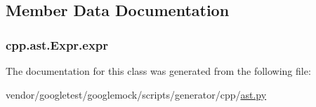 \subsection{Member Data Documentation}
\subsubsection[{\texorpdfstring{expr}{expr}}]{\setlength{\rightskip}{0pt plus 5cm}cpp.\+ast.\+Expr.\+expr}\hypertarget{classcpp_1_1ast_1_1Expr_a2f4e13fb0176f2616f8703103c806462}{}\label{classcpp_1_1ast_1_1Expr_a2f4e13fb0176f2616f8703103c806462}


The documentation for this class was generated from the following file\+:\begin{DoxyCompactItemize}
\item 
vendor/googletest/googlemock/scripts/generator/cpp/\hyperlink{ast_8py}{ast.\+py}\end{DoxyCompactItemize}
